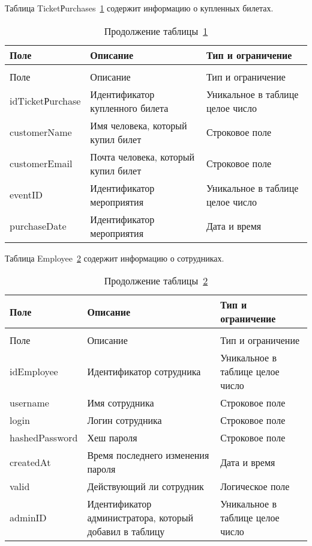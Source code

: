 Таблица TicketРurchases~\ref{tbl:TicketРurchases} содержит информацию о купленных билетах.

\begin{longtable}{|
		>{\centering\arraybackslash}m{}|
		>{\centering\arraybackslash}m{}|
		>{\centering\arraybackslash}m{}|
	}
	\caption{Таблица купленых билетов~(TicketРurchases)}\label{tbl:TicketРurchases} \\\hline
	Поле & Описание & Тип и ограничение  \\\hline    
	\endfirsthead
	\caption*{Продолжение таблицы~\ref{tbl:TicketРurchases} } \\\hline
	Поле & Описание & Тип и ограничение  \\\hline           
	\endhead
	\endfoot
	idTicketРurchase & Идентификатор купленного билета & Уникальное в таблице целое число \\\hline
	customerName  & Имя человека, который купил билет & Строковое поле \\\hline
	customerEmail & Почта человека, который купил билет & Строковое поле \\\hline
	eventID & Идентификатор мероприятия & Уникальное в таблице целое число \\\hline
	purchaseDate & Идентификатор мероприятия & Дата и время \\\hline
\end{longtable}

Таблица Employee~\ref{tbl:Employee} содержит информацию о сотрудниках.

\begin{longtable}{|
		>{\centering\arraybackslash}m{.33\textwidth - 2\tabcolsep}|
		>{\centering\arraybackslash}m{.34\textwidth - 2\tabcolsep}|
		>{\centering\arraybackslash}m{.33\textwidth - 2\tabcolsep}|
	}
	\caption{Таблица сотрудников~(Employee)}\label{tbl:Employee} \\\hline
	Поле & Описание & Тип и ограничение  \\\hline    
	\endfirsthead
	\caption*{Продолжение таблицы~\ref{tbl:Employee} } \\\hline
	Поле & Описание & Тип и ограничение  \\\hline           
	\endhead
	\endfoot
	idEmployee & Идентификатор сотрудника & Уникальное в таблице целое число \\\hline
	username  & Имя сотрудника & Строковое поле \\\hline
	login & Логин сотрудника & Строковое поле \\\hline
	hashedPassword & Хеш пароля & Строковое поле \\\hline
	createdAt & Время последнего изменения пароля & Дата и время \\\hline
	valid & Действующий ли сотрудник & Логическое поле \\\hline
	adminID & Идентификатор администратора, который добавил в таблицу & Уникальное в таблице целое число \\\hline
\end{longtable}

